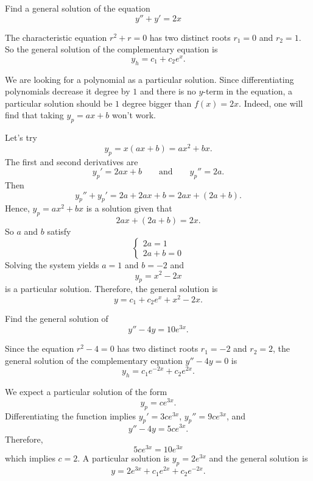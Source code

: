 \begin{example}
  Find a general solution of the equation 
  \[y'' + y' = 2x\]
\end{example}
\begin{solution}
The characteristic equation $r^2+r=0$ has two distinct roots $r_1=0$ and $r_2=1$. So the general solution of the complementary equation is
\[y_h=c_1+c_2e^x.\]

We are looking for a polynomial as a particular solution. Since differentiating polynomials decrease it degree by $1$ and there is no $y$-term in the equation, a particular solution should be $1$ degree bigger than $f(x)=2x$. Indeed, one will find that taking $y_p=ax+b$ won't work.

Let's try
\[y_p =x(ax + b)=a x^2 + bx.\]
The first and second derivatives are
\[y_p' = 2ax + b\qquad\text{and}\qquad y_p'' = 2a .\]
Then 
\[y_p'' +  y_p '= 2a + 2ax + b = 2a x + (2a+b).\]
Hence, $y_p =  a x^2 + bx$ is a solution given that 
\[2a x + (2a+b) = 2x.\]
So $a$ and $b$ satisfy
\[
  \begin{cases}
    2a  =  1\\
    2a+b=  0 
  \end{cases}
\]
Solving the system yields $a=1$ and $b = -2$ and 
\[y_p =  x^2 - 2x\]
is a particular solution.
Therefore, the general solution is
\[y=c_1+c_2e^x+x^2-2x.\]
\end{solution}

\begin{exercise}
  Find the general solution of 
  \[ y ''- 4 y  = 10e^{3x}. \]
\end{exercise}
\begin{exersol}
  Since the equation $r^2-4=0$ has two distinct roots $r_1=-2$ and $r_2=2$, the general solution of the complementary equation $y ''- 4 y  = 0$ is 
\[y_h= c_1 e^{-2x} + c_2 e^{2x}.\]

We expect a particular solution of the form 
\[y_p= c e^{3x}.\]
Differentiating the function implies $y_p' = 3 ce^{3x}$, $y_p'' = 9 c e^{3x}$,
and 
\[y ''- 4 y  = 5c e^{3x}.\]
Therefore, 
\[5c e^{3x}= 10e^{3x}\]
which implies $c=2$. A particular solution is  $y_p= 2e^{3x}$ and the general solution is 
\[y=  2e^{3x} +  c_1 e^{2x} + c_2 e^{-2x}.\]
\end{exersol}

